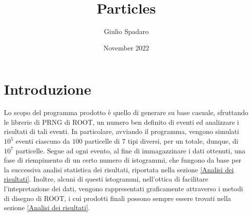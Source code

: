 \documentclass{article}
\title{Particles}
\author{Giulio Spadaro}
\date{November 2022}
\begin{document}
\maketitle

\section{Introduzione}
\label{Introduzione}
Lo scopo del programma prodotto è quello di generare su base casuale, sfruttando le librerie di PRNG di ROOT, un numero ben definito di eventi ed analizzare i risultati di tali eventi. In particolare, avviando il programma, vengono simulati \(10^5\) eventi ciascuno da \(100\) particelle di \(7\) tipi diversi, per un totale, dunque, di \(10^7\) particelle. Segue ad ogni evento, al fine di immagazzinare i dati ottenuti, una fase di riempimento di un certo numero di istogrammi, che fungono da base per la successiva analisi statistica dei risultati, riportata nella sezione \ref{Analisi dei risultati}. Inoltre, alcuni di questi istogrammi, nell'ottica di facilitare l'intepretazione dei dati, vengono rappresentati graficamente attraverso i metodi di disegno di ROOT, i cui prodotti finali possono sempre essere trovati nella sezione \ref{Analisi dei risultati}.
\end{document}
